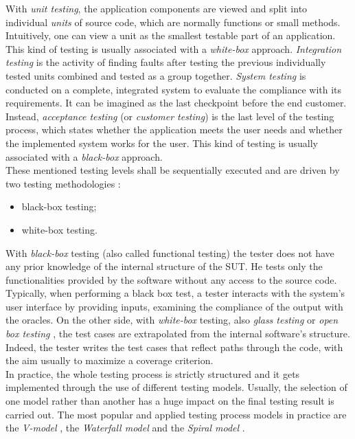 With \textit{unit testing}, the application components are viewed and split into  individual \textit{units} of source code, which are normally functions or small methods. Intuitively, one can view a unit as the smallest testable part of an application. This kind of testing is usually associated with a \textit{white-box} approach. \textit{Integration testing} is the activity of finding faults after testing the previous individually tested units combined and tested as a group together. \textit{System testing} is conducted on a complete, integrated system to evaluate the compliance with its requirements. It can be imagined as the last checkpoint before the end customer. Instead, \textit{acceptance testing} (or \textit{customer testing}) is the last level of the testing process, which states whether the application meets the user needs and whether the implemented system works for the user. This kind of testing is usually associated with a \textit{black-box} approach. 
\\
These mentioned testing levels shall be sequentially executed and are driven by two testing methodologies \cite{white-box, black-box}: 
\begin{itemize}
\item black-box testing;
\item white-box testing.
\end{itemize} 
With \textit{black-box} testing (also called functional testing) the tester does not have any prior knowledge of the internal structure of the SUT. He tests only the functionalities provided by the software without any access to the source code. Typically, when performing a black box test, a tester interacts with the system's user interface by providing inputs, examining the compliance of the output with the oracles. On the other side, with \textit{white-box} testing, also \textit{glass testing} or \textit{open box testing} \cite{grano}, the test cases are extrapolated from the internal software's structure. Indeed, the tester writes the test cases that reflect paths through the code, with the aim usually to maximize a coverage criterion. \\
In practice, the whole testing process is strictly structured and it gets implemented through the use of different testing models. Usually, the selection of one model rather than another has a huge impact on the final testing result is carried out. The most popular and applied testing process models in practice are the \textit{V-model} \cite{vmodel}, the \textit{Waterfall model}\cite{waterfallmodel} and the \textit{Spiral model} \cite{spiralmodel}. \\
